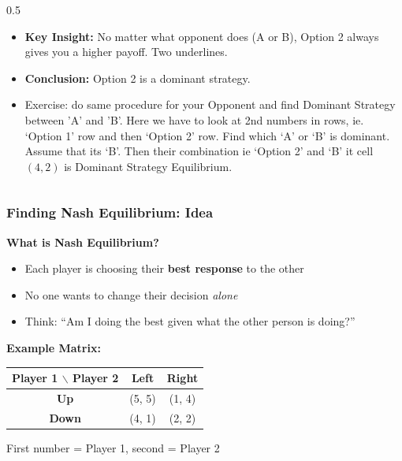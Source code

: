 \begin{frame}[fragile]
\begin{columns}
\begin{column}[T]{0.5\linewidth}
\begin{itemize}
        \item \textbf{Key Insight:}  
        No matter what opponent does (A or B), Option 2 always gives you a higher payoff. Two  underlines.
        
        \item \textbf{Conclusion:} Option 2 is a dominant strategy. 
        \item Exercise: do same procedure for your Opponent and find Dominant Strategy between 'A' and 'B'. Here we have to look at 2nd numbers in rows, ie. `Option 1' row and then `Option 2' row. Find which `A' or `B' is dominant. Assume that its `B'. Then their combination ie `Option 2' and `B' it cell $(4,2)$ is Dominant Strategy Equilibrium.
      \end{itemize}
    \end{column}
  \end{columns}
\end{frame}

\begin{frame}[fragile]\frametitle{Finding Nash Equilibrium: Idea}

\textbf{What is Nash Equilibrium?}
\begin{itemize}
  \item Each player is choosing their \textbf{best response} to the other
  \item No one wants to change their decision \textit{alone}
  \item Think: “Am I doing the best given what the other person is doing?”
\end{itemize}

\vspace{8pt}
\textbf{Example Matrix:}
\begin{center}
\begin{tabular}{|c|c|c|}
  \hline
  \textbf{Player 1 $\backslash$ Player 2} & \textbf{Left} & \textbf{Right} \\
  \hline
  \textbf{Up} & (5, 5) & (1, 4) \\
  \hline
  \textbf{Down} & (4, 1) & (2, 2) \\
  \hline
\end{tabular}
\end{center}

\small{First number = Player 1, second = Player 2}

\end{frame}

